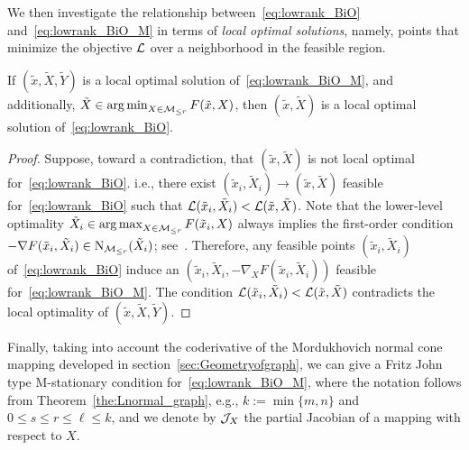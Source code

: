 We then investigate the relationship between~\eqref{eq:lowrank_BiO} and~\eqref{eq:lowrank_BiO_M} in terms of \emph{local optimal solutions}, namely, points that minimize the objective $\mathcal{L}$ over a neighborhood in the feasible region.
\begin{proposition}
    If $(\tilde{x},\tilde{X},\tilde{Y})$ is a local optimal solution of~\eqref{eq:lowrank_BiO_M}, and additionally, $\tilde{X}\in\operatorname*{arg\,min}_{X\in\mathcal{M}_{\le r}} F(\tilde{x},X)$, then $(\tilde{x},\tilde{X})$ is a local optimal solution of~\eqref{eq:lowrank_BiO}.
\end{proposition}
\begin{proof}
    Suppose, toward a contradiction, that $(\tilde{x},\tilde{X})$ is not local optimal for~\eqref{eq:lowrank_BiO}. i.e., there exist $(\tilde{x}_i,\tilde{X}_i)\to(\tilde{x},\tilde{X})$ feasible for~\eqref{eq:lowrank_BiO} such that $\mathcal{L}(\tilde{x}_i,\tilde{X}_i)<\mathcal{L}(\tilde{x},\tilde{X})$. Note that the lower-level optimality $\tilde{X}_i\in\operatorname*{arg\,max}_{X\in\mathcal{M}_{\le r}} F(\tilde{x}_i,X)$ always implies the first-order condition $-\nabla F(\tilde{x}_i,\tilde{X}_i)\in\mathrm{N}_{\mathcal{M}_{\le r}}(\tilde{X}_i)$; see~\cite{schneider2015Lojaconvergence}. Therefore, any feasible points $(\tilde{x}_i,\tilde{X}_i)$ of~\eqref{eq:lowrank_BiO} induce an $(\tilde{x}_i,\tilde{X}_i,-\nabla_XF(\tilde{x}_i,\tilde{X}_i))$ feasible for~\eqref{eq:lowrank_BiO_M}. The condition $\mathcal{L}(\tilde{x}_i,\tilde{X}_i)<\mathcal{L}(\tilde{x},\tilde{X})$ contradicts the local optimality of $(\tilde{x},\tilde{X},\tilde{Y})$.
\end{proof}



Finally, taking into account the coderivative of the Mordukhovich normal cone mapping developed in section~\ref{sec:Geometryofgraph}, we can give a Fritz John type M-stationary condition for~\eqref{eq:lowrank_BiO_M}, where the notation follows from Theorem~\ref{the:Lnormal_graph}, e.g., $k:=\min\{m,n\}$ and $0\le s\le r \le \ell \le k$, and we denote by $\mathcal{J}_X$ the partial Jacobian of a mapping with respect to $X$.

